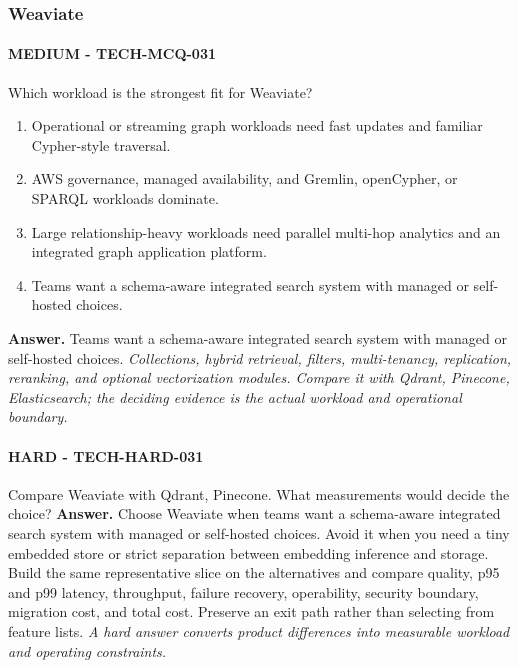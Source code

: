 \subsubsection*{Weaviate}
\paragraph{MEDIUM - TECH-MCQ-031} Which workload is the strongest fit for Weaviate?
\begin{enumerate}[label=\Alph*.]
\item Operational or streaming graph workloads need fast updates and familiar Cypher-style traversal.
\item AWS governance, managed availability, and Gremlin, openCypher, or SPARQL workloads dominate.
\item Large relationship-heavy workloads need parallel multi-hop analytics and an integrated graph application platform.
\item Teams want a schema-aware integrated search system with managed or self-hosted choices.
\end{enumerate}
\textbf{Answer.} Teams want a schema-aware integrated search system with managed or self-hosted choices.
\textit{Collections, hybrid retrieval, filters, multi-tenancy, replication, reranking, and optional vectorization modules. Compare it with Qdrant, Pinecone, Elasticsearch; the deciding evidence is the actual workload and operational boundary.}
\paragraph{HARD - TECH-HARD-031} Compare Weaviate with Qdrant, Pinecone. What measurements would decide the choice?
\textbf{Answer.} Choose Weaviate when teams want a schema-aware integrated search system with managed or self-hosted choices. Avoid it when you need a tiny embedded store or strict separation between embedding inference and storage. Build the same representative slice on the alternatives and compare quality, p95 and p99 latency, throughput, failure recovery, operability, security boundary, migration cost, and total cost. Preserve an exit path rather than selecting from feature lists.
\textit{A hard answer converts product differences into measurable workload and operating constraints.}
